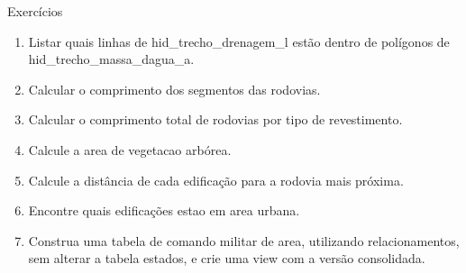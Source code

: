 \documentclass{beamer}
\begin{document}
\begin{frame}[fragile]{Exercícios}


\begin{enumerate}
\item Listar quais linhas de hid\_trecho\_drenagem\_l estão dentro de polígonos de hid\_trecho\_massa\_dagua\_a.
\item Calcular o comprimento dos segmentos das rodovias.
\item Calcular o comprimento total de rodovias por tipo de revestimento.
\item Calcule a area de vegetacao arbórea.
\item Calcule a distância de cada edificação para a rodovia mais próxima.
\item Encontre quais edificações estao em area urbana.
\item Construa uma tabela de comando militar de area, utilizando relacionamentos, sem alterar a tabela estados, e crie uma view com a versão consolidada.
\end{enumerate}

\end{frame}
\end{document}
